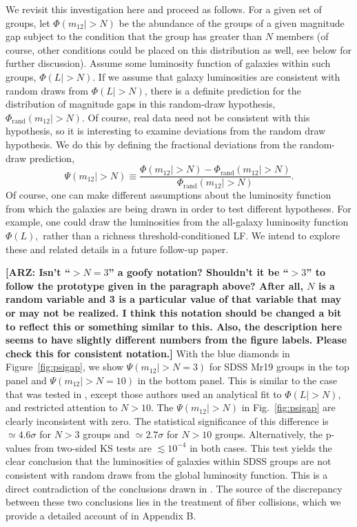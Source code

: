\documentclass[usenatbib,usegraphicx,letterpaper]{mn2e}
\newcommand{\beq}{\begin{equation}}
\newcommand{\eeq}{\end{equation}}
\newcommand{\monetwo}{m_{12}}
\newcommand{\phirand}{\Phi_{\mathrm{rand}}}
\begin{document}
We revisit this investigation here and proceed as follows. For a given set of groups, let 
$\Phi(\monetwo|> N)$ be the abundance of the groups of 
a given magnitude gap subject to the condition that 
the group has greater than $N$ members (of course, other conditions 
could be placed on this distribution as well, 
see below for further discussion).  Assume 
some luminosity function of galaxies within such 
groups, $\Phi(L|> N)$.  If we assume that galaxy 
luminosities are consistent with random draws from 
$\Phi(L|> N)$, there is a definite prediction for 
the distribution of magnitude gaps in this random-draw 
hypothesis, $\phirand(\monetwo|> N)$.  Of course, 
real data need not be consistent with this hypothesis, 
so it is interesting to examine deviations from the 
random draw hypothesis.  We do this by defining the 
fractional deviations from the random-draw prediction, 
%
\beq
\label{eq:adf} 
\Psi(\monetwo|> N) \equiv 
\frac{\Phi(\monetwo|> N)-\phirand(\monetwo|> N)}{\phirand(\monetwo|> N)}.
\eeq 
%
Of course, one can make different assumptions about the luminosity 
function from which the galaxies are being drawn in order 
to test different hypotheses. For example, one could draw 
the luminosities from the all-galaxy luminosity function 
$\Phi(L),$ rather than a richness threshold-conditioned LF. 
We intend to explore these and related details in a future follow-up paper.

{\bf [ARZ: Isn't ``$>N=3$'' a goofy notation?  Shouldn't it be 
``$>3$'' to follow the prototype given in the paragraph above?  
After all, $N$ is a random variable and 3 is a particular value 
of that variable that may or may not be realized.
I think this notation should be changed a bit to reflect this 
or something similar to this.  Also, the description here 
seems to have slightly different numbers from the figure 
labels.  Please check this for consistent notation.]}
With the blue diamonds in Figure~\ref{fig:psigap}, we show 
$\Psi(\monetwo|>N=3)$ for SDSS Mr19 groups in the 
top panel and  $\Psi(\monetwo|> N=10)$ in the bottom panel.  
This is similar to the case that 
was tested in \citet{paranjape_sheth11}, except those authors 
used an analytical fit \citep{bernardi_etal10} to $\Phi(L|> N),$ 
and restricted attention to $N>10.$
The $\Psi(\monetwo|> N)$ in Fig.~\ref{fig:psigap} are 
clearly inconsistent with zero.  The statistical significance 
of this difference is $\simeq 4.6\sigma$ for $N > 3$ groups 
and $\simeq 2.7\sigma$ for $N > 10$ groups.  Alternatively, 
the p-values from two-sided KS tests are $\lesssim 10^{-4}$ 
in both cases.  This test yields the clear conclusion that 
the luminosities of galaxies within SDSS groups are not 
consistent with random draws from the global luminosity 
function.  This is a direct contradiction of the conclusions drawn 
in \citet{paranjape_sheth11}. The source of the discrepancy between 
these two conclusions lies in the treatment of fiber collisions, 
which we provide a detailed account of in Appendix B.
\end{document}
